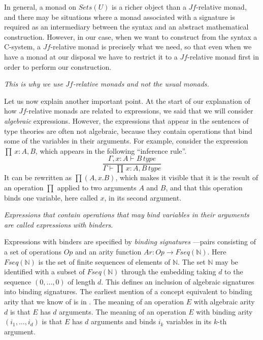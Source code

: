 \documentclass[12pt]{amsart}
\numberwithin{proposition}{subsection}
\newcommand{\llabel}[1]{\label{#1}}
\newcommand{\sr}{\rightarrow}
\newcommand{\nn}{{\mathbb N}}
\newcommand{\nat}{\nn}
\begin{document}
In general, a monad on $Sets(U)$ is a richer object than a $Jf$-relative monad,
and there may be situations where a monad associated with a signature is
required as an intermediary between the syntax and an abstract mathematical
construction. However, in our case, when we want to construct from the syntax a
C-system, a $Jf$-relative monad is precisely what we need, so that even when we
have a monad at our disposal we have to restrict it to a $Jf$-relative monad
first in order to perform our construction.

{\em This is why we use $Jf$-relative monads and not the usual monads.}

Let us now explain another important point. At the start of our
explanation of how $Jf$-relative monads are related to expressions, we said
that we will consider {\em algebraic} expressions. However, the expressions
that appear in the sentences of type theories are often not algebraic, because
they contain operations that bind some of the variables in their
arguments. For example, consider the expression $\prod\,x:A,B$, which appears in
the following ``inference rule''.
%
\begin{equation}
\llabel{2017.03.02.eq1}
\frac{\Gamma,x:A\vdash B\,type}{\Gamma\vdash \prod\,x:A,B\,type}
\end{equation}%
%
It can be rewritten as $\prod(A,x.B)$, which makes it
visible that it is the result of an operation $\prod$ applied to two arguments
$A$ and $B$, and that this operation binds one variable, here called $x$, in its
second argument.

{\em Expressions that contain operations that may bind variables in their
  arguments are called expressions with binders}.
 
Expressions with binders are specified by {\em binding signatures}%
---pairs consisting of a set of operations $Op$ and an arity function $Ar:Op\sr Fseq(\nat)$.
Here $Fseq(\nat)$ is the set of finite sequences of elements of
$\nat$. The set $\nat$ may be identified with a subset of $Fseq(\nat)$ through the
embedding taking $d$ to the sequence $(0,\dots,0)$ of length $d$. This defines
an inclusion of algebraic signatures into binding signatures. The earliest
mention of a concept equivalent to binding arity that we know of is in
\cite{Aczel1978}. The meaning of an operation $E$ with algebraic arity $d$
is that $E$ has $d$ arguments. The meaning of an operation $E$ with binding
arity $(i_1,\dots,i_d)$ is that $E$ has $d$ arguments and binds $i_k$ variables
in its $k$-th argument.
\end{document}
